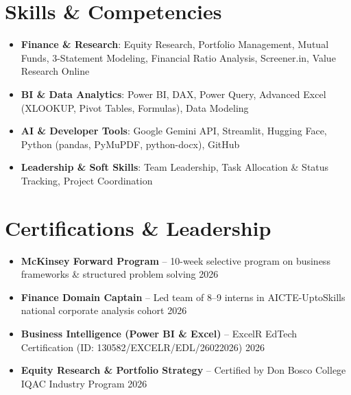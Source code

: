 \documentclass[letterpaper,11pt]{article}
\begin{document}
\section{Skills \& Competencies}
 \begin{itemize}[leftmargin=0.15in, label={}, itemsep=2.5pt, parsep=0pt, topsep=2pt]
    \small
    \item \textbf{Finance \& Research}{: Equity Research, Portfolio Management, Mutual Funds, 3-Statement Modeling, Financial Ratio Analysis, Screener.in, Value Research Online }
    \item \textbf{BI \& Data Analytics}{: Power BI, DAX, Power Query, Advanced Excel (XLOOKUP, Pivot Tables, Formulas), Data Modeling }
    \item \textbf{AI \& Developer Tools}{: Google Gemini API, Streamlit, Hugging Face, Python (pandas, PyMuPDF, python-docx), GitHub }
    \item \textbf{Leadership \& Soft Skills}{: Team Leadership, Task Allocation \& Status Tracking, Project Coordination}
 \end{itemize}

\section{Certifications \& Leadership}
  \begin{itemize}[leftmargin=0.15in, label={}, itemsep=2.5pt, parsep=0pt, topsep=2pt]
    \small
    \item \textbf{McKinsey Forward Program} -- 10-week selective program on business frameworks \& structured problem solving \hfill 2026
    \item \textbf{Finance Domain Captain} -- Led team of 8--9 interns in AICTE-UptoSkills national corporate analysis cohort \hfill 2026
   
    \item \textbf{Business Intelligence (Power BI \& Excel)} -- ExcelR EdTech Certification (ID: 130582/EXCELR/EDL/26022026) \hfill 2026
    \item \textbf{Equity Research \& Portfolio Strategy} -- Certified by Don Bosco College IQAC Industry Program \hfill 2026
  \end{itemize}
\end{document}
